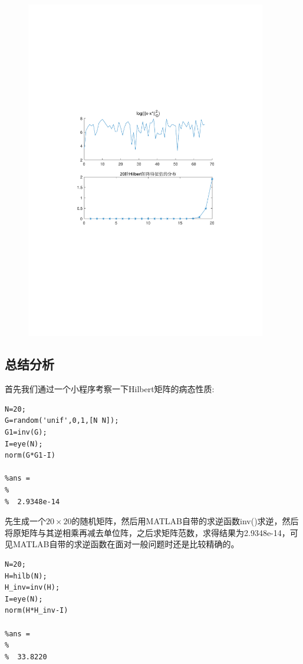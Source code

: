 \begin{figure}[H]
\centering
\includegraphics[width=10.5cm]{fig/5_4.pdf}
\end{figure}

\subsection{总结分析}
首先我们通过一个小程序考察一下Hilbert矩阵的病态性质:

\begin{lstlisting}
N=20;
G=random('unif',0,1,[N N]);
G1=inv(G);
I=eye(N);
norm(G*G1-I)

%ans =
%
%  2.9348e-14
\end{lstlisting}

先生成一个$20\times 20$的随机矩阵，然后用MATLAB自带的求逆函数inv()求逆，然后将原矩阵与其逆相乘再减去单位阵，之后求矩阵范数，求得结果为2.9348e-14，可见MATLAB自带的求逆函数在面对一般问题时还是比较精确的。

\begin{lstlisting}
N=20;
H=hilb(N);
H_inv=inv(H);
I=eye(N);
norm(H*H_inv-I)

%ans =
%
%  33.8220
\end{lstlisting}



